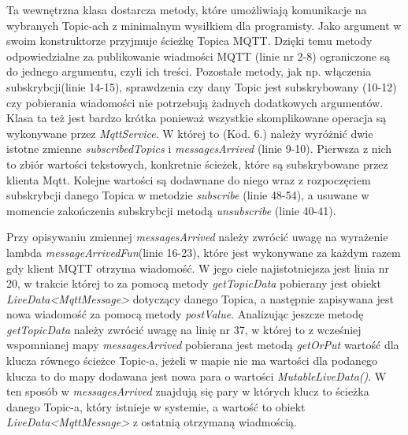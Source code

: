  Ta wewnętrzna klasa dostarcza metody, które umożliwiają komunikacje na wybranych Topic-ach z minimalnym wysiłkiem dla programisty. Jako argument w swoim konstruktorze przyjmuje ścieżkę Topica MQTT. Dzięki temu metody odpowiedzialne za publikowanie wiadmości MQTT (linie nr 2-8) ograniczone są do jednego argumentu, czyli ich treści. Pozostałe metody, jak np. włączenia subskrybcji(linie 14-15), sprawdzenia czy dany Topic jest subskrybowany (10-12) czy pobierania wiadomości nie potrzebują żadnych dodatkowych argumentów. Klasa ta też jest bardzo krótka ponieważ wszystkie skomplikowane operacja są wykonywane przez \textit{MqttService}. W której to (Kod. 6.) należy wyróżnić dwie istotne zmienne \textit{subscribedTopics} i \textit{messagesArrived} (linie 9-10). Pierwsza z nich to zbiór wartości tekstowych, konkretnie ścieżek, które są subskrybowane przez klienta Mqtt. Kolejne wartości są dodawnane do niego wraz z rozpoczęciem subskrybcji danego Topica w metodzie \textit{subscribe} (linie 48-54), a usuwane w momencie zakończenia subskrybcji metodą \textit{unsubscribe} (linie 40-41).

 Przy opisywaniu zmiennej \textit{messagesArrived} należy zwrócić uwagę na wyrażenie lambda \textit{messageArrivedFun}(linie 16-23), które jest wykonywane za każdym razem gdy klient MQTT otrzyma wiadomość. W jego ciele najistotniejsza jest linia nr 20, w trakcie której to za pomocą metody \textit{getTopicData} pobierany jest obiekt \textit{LiveData<MqttMessage>} dotyczący danego Topica, a następnie zapisywana jest nowa wiadomość za pomocą metody \textit{postValue}. Analizując jeszcze metodę \textit{getTopicData} należy zwrócić uwagę na linię nr 37, w której to z wcześniej wspomnianej mapy \textit{messagesArrived} pobierana jest metodą \textit{getOrPut} wartość dla klucza równego ścieżce Topic-a, jeżeli w mapie nie ma wartości dla podanego klucza to do mapy dodawana jest nowa para o wartości \textit{MutableLiveData()}. W ten sposób w \textit{messagesArrived} znajdują się pary w których klucz to ścieżka danego Topic-a, który istnieje w systemie, a wartość to obiekt \textit{LiveData<MqttMessage>} z ostatnią otrzymaną wiadmością.



